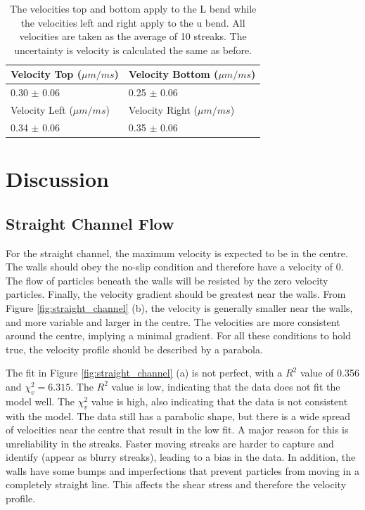 \documentclass[12pt]{article}
\begin{document}
\begin{table}[H]
    \begin{tabular}{|l|l|}
    \hline
    Velocity Top ($\mu m/ms$) & Velocity Bottom ($\mu m/ms$) \\ \hline
    0.30 $\pm$ 0.06 &  0.25 $\pm$ 0.06  \\ \hline
    Velocity Left ($\mu m/ms$) & Velocity Right ($\mu m/ms$) \\ \hline
    0.34 $\pm$ 0.06 & 0.35 $\pm$ 0.06 \\ \hline
    \end{tabular}
    \centering
    \label{Tab:part2_c}
    \caption{The velocities top and bottom apply to the L bend while the velocities left and right apply to the u bend. All velocities are taken as the average of 10 streaks. The uncertainty is velocity is calculated the same as before.}
\end{table}

\section{Discussion}
\subsection*{Straight Channel Flow}
For the straight channel, the maximum velocity is expected to be in the centre. The walls should obey the no-slip condition and therefore have a velocity of 0. The flow of particles beneath the walls will be resisted by the zero velocity particles. Finally, the velocity gradient should be greatest near the walls. From Figure \ref{fig:straight_channel} (b), the velocity is generally smaller near the walls, and more variable and larger in the centre. 
The velocities are more consistent around the centre, implying a minimal gradient. For all these conditions to hold true, the velocity profile should be described by a parabola. 

The fit in Figure \ref{fig:straight_channel} (a) is not perfect, with a $R^2$ value of 0.356 and $\chi_v^2=6.315$. The $R^2$ value is low, indicating that the data does not fit the model well. The $\chi_v^2$ value is high, also indicating that the data is not consistent with the model. The data still has a parabolic shape, but there is a wide spread of velocities near the centre that result in the low fit.
A major reason for this is unreliability in the streaks. Faster moving streaks are harder to capture and identify (appear as blurry streaks), leading to a bias in the data. In addition, the walls have some bumps and imperfections that prevent particles from moving in a completely straight line. This affects the shear stress and therefore the velocity profile.
\end{document}
